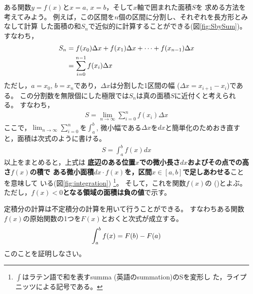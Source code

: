 \documentclass[twocolumn,11pt]{jarticle}
\begin{document}
ある関数$y=f(x)$と$x=a$, $x=b$，そして$x$軸で囲まれた面積$S$を
求める方法を考えてみよう。
例えば，この区間を$n$個の区間に分割し、それぞれを長方形とみなして計算
した面積の和$S_n$で近似的に計算することができる(図\ref{fig:SbySum})。
すなわち，
\begin{align}
  S_n&=f(x_0)\Delta x+f(x_1)\Delta x+\cdots+f(x_{n-1})\Delta x\notag\\
  &=\sum_{i=0}^{n-1}f(x_i)\Delta x
\end{align}
ただし，$a=x_0$, $b=x_n$であり，$\Delta x$は分割した1区間の幅
($\Delta x=x_{i+1}-x_i$)である。
この分割数を無限個にした極限では$S_n$は真の面積$S$に近付くと考えられる。
すなわち，
\begin{align}
  S=\lim_{n\to \infty}\sum_{i=0}^nf(x_i)\Delta x
\end{align}
ここで，$\displaystyle\lim_{n\to \infty}\sum_{i=0}^n$を$\displaystyle\int_a^b$,
微小幅である$\Delta x$を$dx$と簡単化のためおき直すと，面積は次式のように書ける。
\begin{align}
\label{eq:integration}
  S=\int_a^bf(x)dx
\end{align}
以上をまとめると，上式は
\textbf{底辺のある位置$x$での微小長さ$dx$およびその点での高さ$f(x)$の積で
ある微小面積$dx\cdot f(x)$を，区間$x\in[a,b]$で足しあわせる}ことを意味して
いる(図\ref{fig:integration})
\footnote{$\int$はラテン語で和を表すsumma (英語のsummation)のSを変形し
  た，ライプニッツによる記号である。}。
そして，これを関数$f(x)$の
()とよぶ。
ただし，\textbf{$f(x)<0$となる領域の面積は負の値}で示す。



\question
定積分の計算は不定積分の計算を用いて行うことができる。
すなわちある関数$f(x)$の原始関数の1つを$F(x)$とおくと次式が成立する。
\begin{align}
  \int_a^bf(x)=F(b)-F(a)\notag
\end{align}
このことを証明しなさい。
\end{document}
